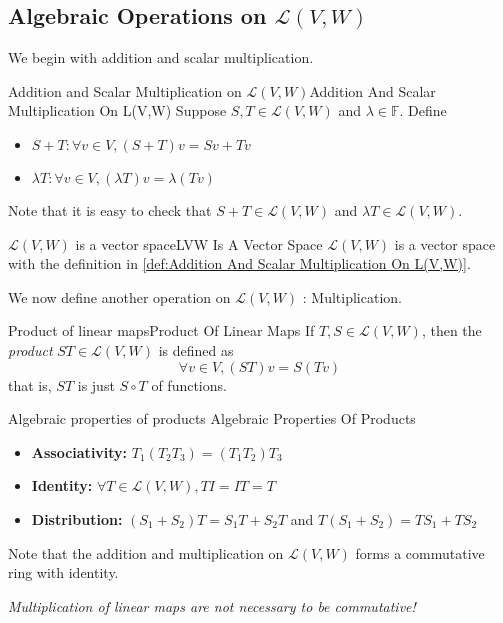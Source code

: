\documentclass[../main.tex]{subfiles}
\begin{document}
\subsection{Algebraic Operations on $\mathscr{L}(V,W)$}

We begin with addition and scalar multiplication.
\begin{definition}{Addition and Scalar Multiplication on $\mathscr{L}(V,W)$}{Addition And Scalar Multiplication On L(V,W)}
Suppose $S,T \in \mathscr{L}(V,W)$ and $\lambda\in \mathbb{F}$. Define
\begin{itemize}
\item $S+T: \forall v\in V, (S+T)v = Sv+Tv$
\item $\lambda T: \forall v\in V, (\lambda T)v = \lambda (Tv)$
\end{itemize}
\end{definition}
Note that it is easy to check that $S+T \in \mathscr{L}(V,W)$ and $\lambda T\in \mathscr{L}(V,W)$.

\begin{theorem}{$\mathscr{L}(V,W)$ is a vector space}{LVW Is A Vector Space}
	$\mathscr{L}(V,W)$ is a vector space with the definition in \ref{def:Addition And Scalar Multiplication On L(V,W)}.
\end{theorem}

We now define another operation on $\mathscr{L}(V,W)$ : Multiplication.
\begin{definition}{Product of linear maps}{Product Of Linear Maps}
If $T,S\in \mathscr{L}(V,W)$, then the \emph{product} $ST\in \mathscr{L}(V,W)$ is defined as
\begin{equation}
	\forall v\in V, (ST)v = S(Tv)
\end{equation}
that is, $ST$ is just $S \circ T$ of functions.
\end{definition}

\begin{theorem}{Algebraic properties of products }{Algebraic Properties Of Products }
\begin{itemize}
\item \textbf{Associativity: }$T_1(T_2T_3) = (T_1T_2)T_3$
\item \textbf{Identity: } $\forall T\in \mathscr{L}(V,W), TI=IT=T$
\item \textbf{Distribution: }$(S_1+S_2)T = S_1T+S_2T$ and $T(S_1+S_2) = TS_1+TS_2$
\end{itemize}
\end{theorem}
\begin{remark}
Note that the addition and multiplication on $\mathscr{L}(V,W)$ forms a commutative ring with identity. 

\emph{Multiplication of linear maps are not necessary to be commutative!}
\end{remark}
\end{document}
